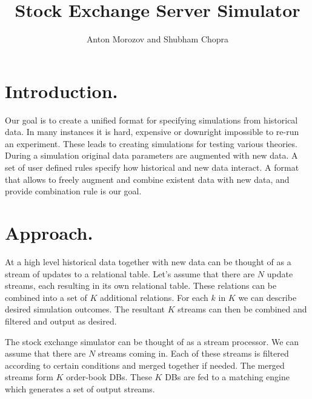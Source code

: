 \documentclass{article}
\begin{document}
    
\title{Stock Exchange Server Simulator}
\author{Anton Morozov and Shubham Chopra}
\maketitle
    
\section{Introduction.}

Our goal is to create a unified format for specifying simulations from historical data. In many instances it is hard, expensive or downright impossible to re-run an experiment. These leads to creating simulations for testing various theories. During a simulation original data parameters are augmented with new data. A set of user defined rules specify how historical and new data interact. A format that allows to freely augment and combine existent data with new data, and provide combination rule is our goal. 


\section{Approach.}

At a high level historical data together with new data can be thought of as a stream of updates to a relational table. Let's assume that there are $N$ update streams, each resulting in its own relational table. These relations can be combined into a set of $K$ additional relations. For each $k$ in $K$ we can describe desired simulation outcomes. The resultant $K$ streams can then be combined and filtered and output as desired.



The stock exchange simulator can be thought of as a stream processor. We can assume that there are $N$ streams coming in. Each of these streams is filtered according to certain conditions and merged together if needed. The merged streams form $K$ order-book DBs. These $K$ DBs are fed to a matching engine which generates a set of output streams.
\end{document}
